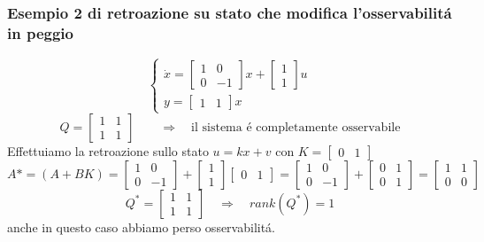\documentclass[../main.tex]{subfiles}
\begin{document}
	\subsubsection{Esempio 2 di retroazione su stato che modifica l'osservabilit\'a in peggio}
		\[
			\begin{cases}
				\dot x =
				\begin{bmatrix}
					1 & 0\\
					0 & -1
				\end{bmatrix} x +
				\begin{bmatrix}
					1\\
					1
				\end{bmatrix} u
				\\
				y =
				\begin{bmatrix}
					1 & 1
				\end{bmatrix} x
			\end{cases}
		\]
		\[
			Q =
			\begin{bmatrix}
				1 & 1\\
				1 & 1
			\end{bmatrix}
			\qquad\Rightarrow\quad\text{il sistema \'e completamente osservabile}
		\]
		Effettuiamo la retroazione sullo stato $ u = kx + v $ con $ K = \left[ \begin{smallmatrix} 0 & 1 \end{smallmatrix} \right] $
		\[
			A* = (A+BK) =
			\begin{bmatrix}
				1 & 0\\
				0 & -1
			\end{bmatrix} +
			\begin{bmatrix}
				1\\
				1
			\end{bmatrix}
			\begin{bmatrix}
				0 & 1
			\end{bmatrix} =
			\begin{bmatrix}
				1 & 0\\
				0 & -1
			\end{bmatrix} +
			\begin{bmatrix}
				0 & 1\\
				0 & 1
			\end{bmatrix} =
			\begin{bmatrix}
				1 & 1\\
				0 & 0
			\end{bmatrix}
		\]
		\[
			Q^{*} =
			\begin{bmatrix}
				1 & 1\\
				1 & 1
			\end{bmatrix}
			\quad\Rightarrow\quad rank(Q^{*}) = 1 
		\]
		anche in questo caso abbiamo perso osservabilit\'a.
		
\end{document}
